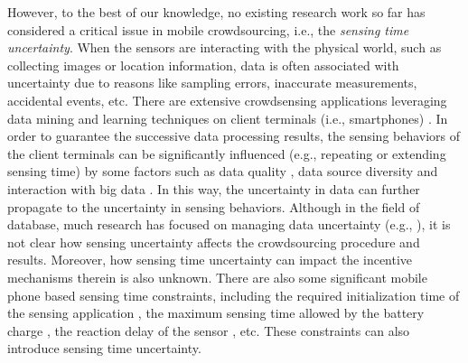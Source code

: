 \documentclass{IEEEtran}
\begin{document}

However, to the best of our knowledge, no existing research work so far has considered a critical issue in mobile crowdsourcing, i.e., the \emph{sensing {\color{black}time} uncertainty}. When the sensors are interacting with the physical world, such as collecting images or location information, data is often associated with uncertainty due to reasons like sampling errors, inaccurate measurements, accidental events, etc. There are extensive crowdsensing applications leveraging data mining and learning techniques on client terminals (i.e., smartphones) \cite{ra2012medusa} \cite{chon2012automatically} \cite{chon2013understanding}. In order to guarantee the successive data processing results, the sensing behaviors of the client terminals can be significantly influenced (e.g., repeating or extending sensing time) by some factors such as data quality \cite{hand2007principles}, data source diversity \cite{chen1996data} and interaction with big data \cite{prather1997medical}. 
In this way, the uncertainty in data can further propagate to the uncertainty in sensing behaviors. 
Although in the field of database, much research has focused on managing data uncertainty (e.g., \cite{hand2007principles} \cite{fayyad1996data}), it is not clear how sensing uncertainty affects the crowdsourcing procedure and results. Moreover, how sensing {\color{black}time} uncertainty can impact the incentive mechanisms therein is also unknown. {\color{black}There are also some significant mobile phone based sensing time constraints, including the required initialization time of the sensing application \cite{charland2011mobile}, the maximum sensing time allowed by the battery charge \cite{wang2009framework}, the reaction delay of the sensor \cite{ra2012medusa}, etc. These constraints can also introduce sensing time uncertainty.}
\end{document}
